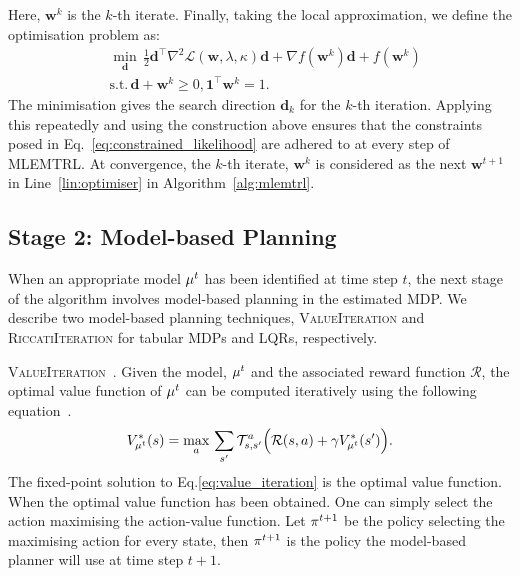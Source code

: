 Here, $\bm{w}^k$ is the $k$-th iterate. Finally, taking the local approximation, we define the optimisation problem as:
\begin{equation}
    \begin{aligned}
        &\underset{\bm{d}}{\min} \, \frac{1}{2}\bm{d}^\top \nabla^2 \mathcal{L}(\bm{w},\lambda,\kappa)\bm{d}+\nabla f(\bm{w}^k)\bm{d}+f(\bm{w}^k)\\
        &\textrm{s.t.} \, \bm{d} + \bm{w}^k \geq 0, \mathbf{1}^\top\bm{w}^k = 1.
    \end{aligned}
\end{equation}
The minimisation gives the search direction $\bm{d}_k$ for the $k$-th iteration. Applying this repeatedly and using the construction above ensures that the constraints posed in Eq.~\ref{eq:constrained_likelihood} are adhered to at every step of MLEMTRL. At convergence, the $k$-th iterate, $\bm{w}^k$ is considered as the next $\bm{w}^{t+1}$ in Line~\ref{lin:optimiser} in Algorithm~\ref{alg:mlemtrl}.

\subsection{Stage 2: Model-based Planning}
When an appropriate model $\mu^t$ has been identified at time step $t$, the next stage of the algorithm involves model-based planning in the estimated MDP. We describe two model-based planning techniques, \textsc{ValueIteration} and \textsc{RiccatiIteration} for tabular MDPs and LQRs, respectively.

\noindent\textsc{ValueIteration~.}
Given the model, $\mu^t$ and the associated reward function $\mathcal{R}$, the optimal value function of $\mu^t$ can be computed iteratively using the following equation~\citep{sutton2018reinforcement}.
\begin{equation}\label{eq:value_iteration}
    V_{\mu^t}^{*}(s) = \underset{a}{\max} \, \sum_{s'}\mathcal{T}_{s,s'}^a\Big(\mathcal{R}(s,a)+\gamma V_{\mu^t}^{*}(s')\Big).
\end{equation}
The fixed-point solution to Eq.\ref{eq:value_iteration} is the optimal value function. When the optimal value function has been obtained. One can simply select the action maximising the action-value function. Let $\pi^{t+1}$ be the policy selecting the maximising action for every state, then $\pi^{t+1}$ is the policy the model-based planner will use at time step $t+1$.

